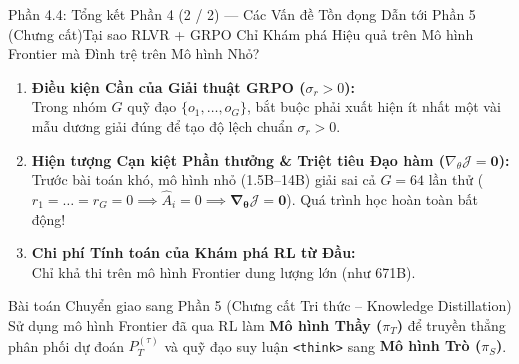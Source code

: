 \begin{frame}{Phần 4.4: Tổng kết Phần 4 (2 / 2) --- Các Vấn đề Tồn đọng Dẫn tới Phần 5 (Chưng cất)}{Tại sao RLVR + GRPO Chỉ Khám phá Hiệu quả trên Mô hình Frontier mà Đình trệ trên Mô hình Nhỏ?}
  \small
  \begin{enumerate}\setlength{\itemsep}{6pt}
    \item \textbf{Điều kiện Cần của Giải thuật GRPO ($\sigma_r > 0$):}\\
      \footnotesize Trong nhóm $G$ quỹ đạo $\{o_1, \dots, o_G\}$, bắt buộc phải xuất hiện ít nhất một vài mẫu dương giải đúng để tạo độ lệch chuẩn $\sigma_r > 0$.
    \item \textbf{Hiện tượng Cạn kiệt Phần thưởng \& Triệt tiêu Đạo hàm ($\nabla_\theta \mathcal{J} = \mathbf{0}$):}\\
      \footnotesize Trước bài toán khó, mô hình nhỏ (1.5B--14B) giải sai cả $G = 64$ lần thử ($r_1 = \dots = r_G = 0 \implies \hat{A}_i = 0 \implies \mathbf{\nabla_\theta \mathcal{J} = 0}$). Quá trình học hoàn toàn bất động!
    \item \textbf{Chi phí Tính toán của Khám phá RL từ Đầu:}\\
      \footnotesize Chỉ khả thi trên mô hình Frontier dung lượng lớn (như 671B).
  \end{enumerate}

  \vspace{0.06cm}
  \begin{exampleblock}{Bài toán Chuyển giao sang Phần 5 (Chưng cất Tri thức -- Knowledge Distillation)}
    \footnotesize
    Sử dụng mô hình Frontier đã qua RL làm \textbf{Mô hình Thầy ($\pi_T$)} để truyền thẳng phân phối dự đoán $P_T^{(\tau)}$ và quỹ đạo suy luận \texttt{<think>} sang \textbf{Mô hình Trò ($\pi_S$)}.
  \end{exampleblock}
\end{frame}
